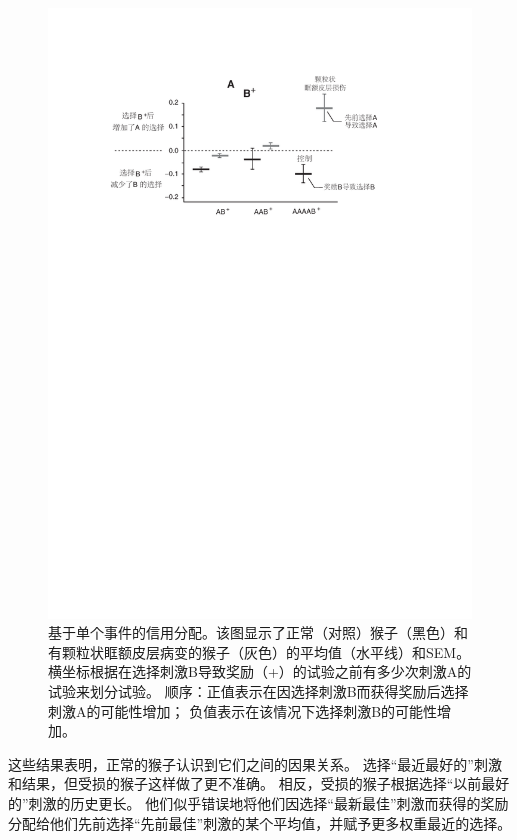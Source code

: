 \begin{figure}[!htb]
	\centering
	\includegraphics{chap4/fig_4_11}
	\caption{基于单个事件的信用分配。该图显示了正常（对照）猴子（黑色）和有颗粒状眶额皮层病变的猴子（灰色）的平均值（水平线）和SEM。
		横坐标根据在选择刺激B导致奖励（+）的试验之前有多少次刺激A的试验来划分试验。
		顺序：正值表示在因选择刺激B而获得奖励后选择刺激A的可能性增加；
		负值表示在该情况下选择刺激B的可能性增加\cite{walton2010separable}。}
	\label{fig:fig_4_11}
\end{figure}


这些结果表明，正常的猴子认识到它们之间的因果关系。
选择“最近最好的”刺激和结果，但受损的猴子这样做了更不准确。
相反，受损的猴子根据选择“以前最好的”刺激的历史更长。
他们似乎错误地将他们因选择“最新最佳”刺激而获得的奖励分配给他们先前选择“先前最佳”刺激的某个平均值，并赋予更多权重最近的选择。\par


